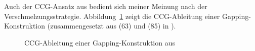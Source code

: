 Auch der CCG-Ansatz aus \cite{Steedman:90} bedient sich meiner Meinung nach der Verschmelzungsstrategie. Abbildung~\ref{fig-ellipse-ccg} zeigt die CCG-Ableitung einer Gapping-Konstruktion (zusammengesetzt aus (63) und (85) in \citealt{Steedman:90}). 
\begin{figure}[t]
\centering
\newcommand{\ccghspc}{-0.7em} 
\caption{\label{fig-ellipse-ccg}CCG-Ableitung einer Gapping-Konstruktion aus \citet[(63),(85)]{Steedman:90}}
\end{figure}
